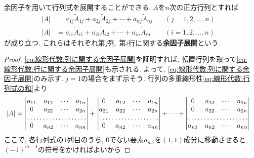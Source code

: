        余因子を用いて行列式を展開することができる. $A$を$n$次の正方行列とすれば
        \begin{align}
            |A|&=a_{1j}\tilde{A}_{1j}+a_{2j}\tilde{A}_{2j}+\cdots+a_{nj}\tilde{A}_{nj}\quad &(j=1,2,\dots,n) \label{eq:線形代数:列に関する余因子展開}\\
            |A|&=a_{i1}\tilde{A}_{i1}+a_{i2}\tilde{A}_{i2}+\cdots+a_{in}\tilde{A}_{in}\quad &(i=1,2,\dots,n) \label{eq:線形代数:行に関する余因子展開}
        \end{align}
        が成り立つ. これらはそれぞれ第$j$列, 第$i$行に関する\textbf{余因子展開}という.
        \begin{proof}
            \eqref{eq:線形代数:列に関する余因子展開}を証明すれば, 転置行列を取って\eqref{eq:線形代数:行に関する余因子展開}も示される. よって, \eqref{eq:線形代数:列に関する余因子展開}のみ示す.
            $j=1$の場合をまず示そう. 行列の多重線形性\eqref{eq:線形代数:行列式の和}より
            \begin{equation*}
                |A|=
                \begin{vmatrix}
                    a_{11} & a_{12} & \cdots & a_{1n}\\
                    0 & a_{22} & \cdots & a_{2n}\\
                    \hdotsfor{4}\\
                    0 & a_{n2} & \cdots & a_{nn}
                \end{vmatrix}
                +\begin{vmatrix}
                    0 & a_{12} & \cdots & a_{1n}\\
                    a_{21} & a_{22} & \cdots & a_{2n}\\
                    \hdotsfor{4}\\
                    0 & a_{n2} & \cdots & a_{nn}
                \end{vmatrix}
                +\cdots
                +\begin{vmatrix}
                    0 & a_{12} & \cdots & a_{1n}\\
                    0 & a_{22} & \cdots & a_{2n}\\
                    \hdotsfor{4}\\
                    a_{n1} & a_{n2} & \cdots & a_{nn}
                \end{vmatrix}
            \end{equation*}
            ここで, 各行列式の$1$列目のうち, $0$でない要素$a_{m1}$を$(1,1)$成分に移動させると, $(-1)^{m-1}$の符号をかければよいから

\end{proof}

